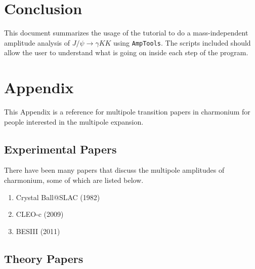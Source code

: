 \documentclass[11pt]{article}
\newcommand{\AmpTools}{{\tt{AmpTools}}}
\begin{document}
\section{Conclusion}

This document summarizes the usage of the tutorial to do a
mass-independent amplitude analysis of $J/\psi \to \gamma KK$ using
\AmpTools. The scripts included should allow the user to understand
what is going on inside each step of the program.

% 

\appendix

\section{Appendix}

This Appendix is a reference for multipole transition papers in
charmonium for people interested in the multipole expansion.

\subsection{Experimental Papers}
There have been many papers that discuss the multipole amplitudes of
charmonium, some of which are listed below.

\begin{enumerate}

\item Crystal Ball@SLAC (1982)
\item CLEO-c (2009)
\item BESIII (2011)
\end{enumerate}


\subsection{Theory Papers}
\end{document}
